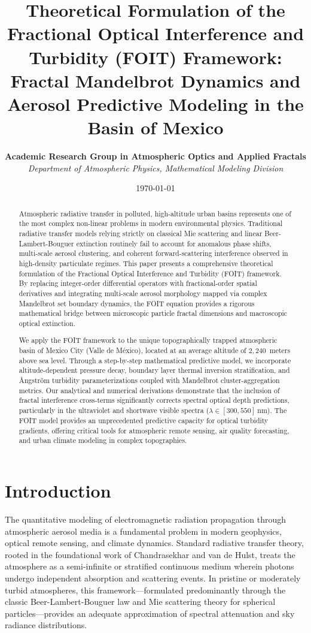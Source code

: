 \documentclass[12pt,a4paper]{article}
\title{\textbf{Theoretical Formulation of the Fractional Optical Interference and Turbidity (FOIT) Framework: Fractal Mandelbrot Dynamics and Aerosol Predictive Modeling in the Basin of Mexico}}
\author{\textbf{Academic Research Group in Atmospheric Optics and Applied Fractals}\\
\textit{Department of Atmospheric Physics, Mathematical Modeling Division}}
\date{\today}
\begin{document}
\maketitle

\begin{abstract}
Atmospheric radiative transfer in polluted, high-altitude urban basins represents one of the most complex non-linear problems in modern environmental physics. Traditional radiative transfer models relying strictly on classical Mie scattering and linear Beer-Lambert-Bouguer extinction routinely fail to account for anomalous phase shifts, multi-scale aerosol clustering, and coherent forward-scattering interference observed in high-density particulate regimes. This paper presents a comprehensive theoretical formulation of the Fractional Optical Interference and Turbidity (FOIT) framework. By replacing integer-order differential operators with fractional-order spatial derivatives and integrating multi-scale aerosol morphology mapped via complex Mandelbrot set boundary dynamics, the FOIT equation provides a rigorous mathematical bridge between microscopic particle fractal dimensions and macroscopic optical extinction.

We apply the FOIT framework to the unique topographically trapped atmospheric basin of Mexico City (Valle de México), located at an average altitude of $2,240$~meters above sea level. Through a step-by-step mathematical predictive model, we incorporate altitude-dependent pressure decay, boundary layer thermal inversion stratification, and Ångström turbidity parameterizations coupled with Mandelbrot cluster-aggregation metrics. Our analytical and numerical derivations demonstrate that the inclusion of fractal interference cross-terms significantly corrects spectral optical depth predictions, particularly in the ultraviolet and shortwave visible spectra ($\lambda \in [300, 550]~\text{nm}$). The FOIT model provides an unprecedented predictive capacity for optical turbidity gradients, offering critical tools for atmospheric remote sensing, air quality forecasting, and urban climate modeling in complex topographies.
\end{abstract}

\newpage
\tableofcontents
\newpage

\section{Introduction}

The quantitative modeling of electromagnetic radiation propagation through atmospheric aerosol media is a fundamental problem in modern geophysics, optical remote sensing, and climate dynamics. Standard radiative transfer theory, rooted in the foundational work of Chandrasekhar and van de Hulst, treats the atmosphere as a semi-infinite or stratified continuous medium wherein photons undergo independent absorption and scattering events. In pristine or moderately turbid atmospheres, this framework—formulated predominantly through the classic Beer-Lambert-Bouguer law and Mie scattering theory for spherical particles—provides an adequate approximation of spectral attenuation and sky radiance distributions.
\end{document}
